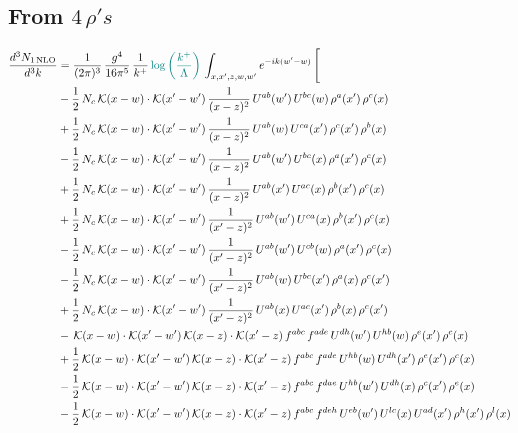 \documentclass[9pt]{article}
\numberwithin{equation}{section}
\begin{document}
\subsection{From $4\, \rho's$}
\begin{align}
\frac{d^{3}N_{1\,\mathrm{NLO}}}{d^{3}k} & = \frac{1}{(2\pi)^{3}}\,\frac{g^{4}}{16\pi^{5}}\,\frac{1}{k^{+}}\,{\color{teal}\log{\left(\frac{k^{+}}{\Lambda}\right)}}\,\int_{x,x',z,w,w'}e^{-ik(w'-w)}\,\Bigg[\notag\\ & -\frac{1}{2}\,N_{c}\,\mathcal{K}(x-w)\cdot\mathcal{K}(x'-w')\,\frac{1}{(x-z)^{2}}\,U^{ab}(w')\,U^{bc}(w)\,\rho^{a}(x')\,\rho^{c}(x)\notag\\
& +\frac{1}{2}\,N_{c}\,\mathcal{K}(x-w)\cdot\mathcal{K}(x'-w')\,\frac{1}{(x-z)^{2}}\,U^{ab}(w)\,U^{ca}(x')\,\rho^{c}(x')\,\rho^{b}(x)\notag\\
& -\frac{1}{2}\,N_{c}\,\mathcal{K}(x-w)\cdot\mathcal{K}(x'-w')\,\frac{1}{(x-z)^{2}}\,U^{ab}(w')\,U^{bc}(x)\,\rho^{a}(x')\,\rho^{c}(x)\notag\\
& +\frac{1}{2}\,N_{c}\,\mathcal{K}(x-w)\cdot\mathcal{K}(x'-w')\,\frac{1}{(x-z)^{2}}\,U^{ab}(x')\,U^{ac}(x)\,\rho^{b}(x')\,\rho^{c}(x)\notag\\
& +\frac{1}{2}\,N_{c}\,\mathcal{K}(x-w)\cdot\mathcal{K}(x'-w')\,\frac{1}{(x'-z)^{2}}\,U^{ab}(w')\,U^{ca}(x)\,\rho^{b}(x')\,\rho^{c}(x)\notag\\
& -\frac{1}{2}\,N_{c}\,\mathcal{K}(x-w)\cdot\mathcal{K}(x'-w')\,\frac{1}{(x'-z)^{2}}\,U^{ab}(w')\,U^{cb}(w)\,\rho^{a}(x')\,\rho^{c}(x)\notag\\
& -\frac{1}{2}\,N_{c}\,\mathcal{K}(x-w)\cdot\mathcal{K}(x'-w')\,\frac{1}{(x'-z)^{2}}\,U^{ab}(w)\,U^{bc}(x')\,\rho^{a}(x)\,\rho^{c}(x')\notag\\
& +\frac{1}{2}\,N_{c}\,\mathcal{K}(x-w)\cdot\mathcal{K}(x'-w')\,\frac{1}{(x'-z)^{2}}\,U^{ab}(x)\,U^{ac}(x')\,\rho^{b}(x)\,\rho^{c}(x')\notag\\
& -\,\mathcal{K}(x-w)\cdot\mathcal{K}(x'-w')\,\mathcal{K}(x-z)\cdot\mathcal{K}(x'-z)\,f^{abc}\,f^{ade}\,U^{dh}(w')\,U^{hb}(w)\,\rho^{e}(x')\,\rho^{c}(x)\notag\\
& +\frac{1}{2}\,\mathcal{K}(x-w)\cdot\mathcal{K}(x'-w')\,\mathcal{K}(x-z)\cdot\mathcal{K}(x'-z)\,f^{abc}\,f^{ade}\,U^{hb}(w)\,U^{dh}(x')\,\rho^{e}(x')\,\rho^{c}(x)\notag\\
& -\frac{1}{2}\,\mathcal{K}(x-w)\cdot\mathcal{K}(x'-w')\,\mathcal{K}(x-z)\cdot\mathcal{K}(x'-z)\,f^{abc}\,f^{dae}\,U^{hb}(w')\,U^{dh}(x)\,\rho^{c}(x')\,\rho^{e}(x)\notag\\
& -\frac{1}{2}\,\mathcal{K}(x-w)\cdot\mathcal{K}(x'-w')\,\mathcal{K}(x-z)\cdot\mathcal{K}(x'-z)\,f^{abc}\,f^{deh}\,U^{eb}(w')\,U^{lc}(x)\,U^{ad}(x')\,\rho^{h}(x')\,\rho^{l}(x)\notag\\

\end{align}
\end{document}
